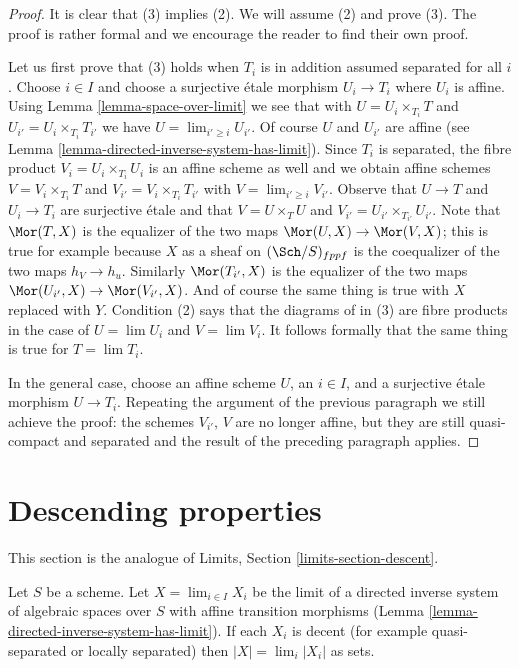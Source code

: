 \begin{proof}
It is clear that (3) implies (2). We will assume (2) and prove (3).
The proof is rather formal and we encourage the reader to find their
own proof.

\medskip\noindent
Let us first prove that (3) holds
when $T_i$ is in addition assumed separated for all $i$.
Choose $i \in I$ and choose a surjective \'etale morphism $U_i \to T_i$
where $U_i$ is affine. Using Lemma \ref{lemma-space-over-limit}
we see that with $U = U_i \times_{T_i} T$ and
$U_{i'} = U_i \times_{T_i} T_{i'}$ we have $U = \lim_{i' \geq i} U_{i'}$.
Of course $U$ and $U_{i'}$ are affine (see
Lemma \ref{lemma-directed-inverse-system-has-limit}).
Since $T_i$ is separated, the fibre product $V_i = U_i \times_{T_i} U_i$
is an affine scheme as well and we obtain affine schemes
$V = V_i \times_{T_i} T$ and
$V_{i'} = V_i \times_{T_i} T_{i'}$ with $V = \lim_{i' \geq i} V_{i'}$.
Observe that $U \to T$ and $U_i \to T_i$ are surjective \'etale and
that $V = U \times_T U$ and $V_{i'} = U_{i'} \times_{T_{i'}} U_{i'}$.
Note that $\Mor(T, X)$ is the equalizer of the two maps
$\Mor(U, X) \to \Mor(V, X)$; this is true for example because
$X$ as a sheaf on $(\Sch/S)_{fppf}$ is the coequalizer
of the two maps $h_V \to h_u$. Similarly
$\Mor(T_{i'}, X)$ is the equalizer of the
two maps $\Mor(U_{i'}, X) \to \Mor(V_{i'}, X)$.
And of course the same thing is true with $X$ replaced with $Y$.
Condition (2) says that the diagrams of in (3) are fibre products
in the case of $U = \lim U_i$ and $V = \lim V_i$.
It follows formally that the same thing is true for $T = \lim T_i$.

\medskip\noindent
In the general case, choose an affine scheme $U$, an $i \in I$,
and a surjective \'etale morphism $U \to T_i$. Repeating the
argument of the previous paragraph we still achieve the proof:
the schemes $V_{i'}$, $V$ are no longer affine, but they are
still quasi-compact and
separated and the result of the preceding paragraph applies.
\end{proof}




\section{Descending properties}
\label{section-descent}

\noindent
This section is the analogue of Limits, Section \ref{limits-section-descent}.

\begin{lemma}
\label{lemma-inverse-limit-sets}
Let $S$ be a scheme. Let $X = \lim_{i \in I} X_i$ be the limit of a directed
inverse system of algebraic spaces over $S$ with affine transition morphisms
(Lemma \ref{lemma-directed-inverse-system-has-limit}). If each $X_i$
is decent (for example quasi-separated or locally separated)
then $|X| = \lim_i |X_i|$ as sets.
\end{lemma}

